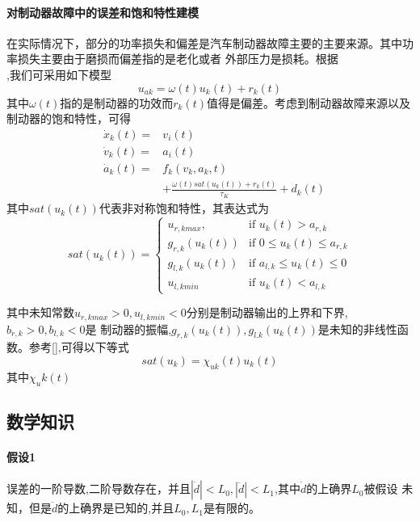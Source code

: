 \documentclass{cjc}
\begin{document}
    \paragraph{对{\color{red}制动器故障}中的误差和饱和特性建模}
    在实际情况下，部分的功率损失和偏差是汽车制动器故障主要的主要来源。其中功率损失主要由于磨损而偏差指的是老化或者
    外部压力是损耗。根据\[\],我们可采用如下模型\:
    \begin{equation}
      u_{ak} = \omega (t) u_k(t) + r_k(t) 
    \end{equation}
    其中$\omega (t)$指的是制动器的功效而$r_k(t)$值得是偏差。考虑到制动器故障来源以及制动器的饱和特性，可得\:
    \begin{eqnarray}
      &\dot{x}_k(t) =& v_i(t) \nonumber \\
      &\dot{v}_k(t) =& a_i(t) \nonumber \\
      &\dot{a}_k(t) =& f_k(v_k,a_k,t) \nonumber \\
      &&+ \frac{\omega (t) sat(u_k(t)) + r_k(t)}{\tau _K} + d_k(t)
    \end{eqnarray}
    其中$sat(u_k(t))$代表非对称饱和特性，其表达式为\:
    \begin{equation}
      sat(u_k(t)) = 
      \begin{cases}
        u_{r,kmax}, & \mbox{if } u_k(t) > a_{r,k} \\
        g_{r,k}(u_k(t)) &\mbox{if }  0\leq u_k(t) \leq a_{r,k}\\
        g_{l,k}(u_k(t)) &\mbox{if } a_{l,k} \leq u_k(t) \leq 0\\
        u_{l,kmin} &\mbox{if } u_k(t) < a_{l,k}
      \end{cases}
    \end{equation}

    其中未知常数$u_{r,kmax} > 0 , u_{l,kmin} < 0$分别是制动器输出的上界和下界,$b_{r,k} > 0, b_{l,k}<0$是
    制动器的振幅,$g_{r,k}(u_k(t)),g_{l.k}(u_k(t))$是未知的非线性函数。参考[],可得以下等式\:
    \begin{equation}
      sat(u_k) = \chi _{uk}(t) u_k(t)
    \end{equation}
    其中$\chi _uk(t)$
    \subsection{数学知识}
    \paragraph{假设1}
    误差的一阶导数,二阶导数存在，并且$|\dot{d}|<L_0,|\ddot{d}|<L_1$,其中$\dot{d}$的上确界$L_0$被假设
    未知，但是$\ddot{d}$的上确界是已知的,并且$L_0,L_1$是有限的。
    
\end{document}
